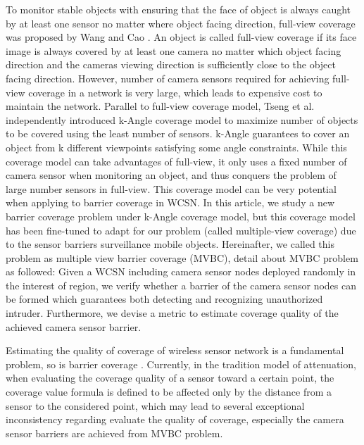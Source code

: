 \documentclass[3p]{elsarticle}
\begin{document}
To monitor stable objects with ensuring that the face of object is always caught by at least one sensor no matter where object facing direction, full-view coverage was proposed by Wang and Cao \cite{wang2013achieving}. An object is called full-view coverage if its face image is always covered by at least one camera no matter which object facing direction and the cameras viewing direction is sufficiently close to the object facing direction.  
However, number of camera sensors required for achieving full-view coverage in a network is very large, which leads to expensive cost to maintain the network. Parallel to full-view coverage model, Tseng et al. \cite{tseng2012k} independently introduced k-Angle coverage model to maximize number of objects to be covered using the least number of sensors. k-Angle guarantees to cover an object from k different viewpoints satisfying some angle constraints. While this coverage model can take advantages of full-view, it only uses a fixed number of camera sensor when monitoring an object, and thus conquers the problem of large number sensors in full-view. 
This coverage model can be very potential when applying to barrier coverage in WCSN. In this article, we study a new barrier coverage problem under k-Angle coverage model, but this coverage model has been fine-tuned to adapt for our problem (called multiple-view coverage) due to the sensor barriers surveillance mobile objects. Hereinafter, we called this problem as multiple view barrier coverage (MVBC), detail about MVBC problem as followed: Given a WCSN including camera sensor nodes deployed randomly in the interest of region, we verify whether a barrier of the camera sensor nodes can be formed  which guarantees both detecting and recognizing unauthorized intruder. Furthermore, we devise a metric to estimate coverage quality of the achieved camera sensor barrier. \par
%
Estimating the quality of coverage of wireless sensor network is a  fundamental problem, so is barrier coverage \cite{sangwan2015survey,ghosh2008coverage}. Currently, in the tradition model of attenuation, when evaluating the coverage quality of a sensor toward a certain point, the coverage value formula is defined to be affected only by the distance from a sensor to the considered point, which may lead to several exceptional inconsistency regarding evaluate the quality of coverage, especially the camera sensor barriers are achieved from MVBC problem. 
\end{document}

